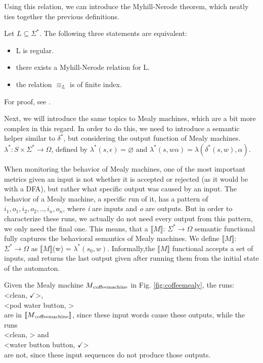 Using this relation, we can introduce the Myhill-Nerode theorem, which neatly ties together the previous definitions.

\begin{theorem}
	Let $L\subseteq\Sigma^*$. The following three statements are equivalent:
	\begin{itemize}
		\item L is regular.
		\item there exists a Myhill-Nerode relation for L.
		\item the relation $\equiv_L$ is of finite index.
	\end{itemize}
	For proof, see \cite{Kozen1977}\cite{10.2307/2033204}.
\end{theorem}

Next, we will introduce the same topics to Mealy machines, which are a bit more complex in this regard. In order to do this, we need to introduce a semantic helper similar to $\delta^*$, but considering the output function of Mealy machines. $\lambda^*: S\times\Sigma^* \to \Omega$, defined by $\lambda^*(s, \epsilon) = \varnothing$ and $\lambda^*(s, w\alpha) = \lambda(\delta^*(s, w), \alpha)$.



When monitoring the behavior of Mealy machines, one of the most important metrics given an input is not whether it is accepted or rejected (as it would be with a DFA), but rather what specific output was caused by an input. The behavior of a Mealy machine, a specific run of it, has a pattern of \textit{$i_1,o_1,i_2,o_2,..,i_n,o_n$}, where \textit{i} are inputs and \textit{o} are outputs. But in order to characterize these runs, we actually do not need every output from this pattern, we only need the final one. This means, that a $\llbracket M\rrbracket$: $\Sigma^*\to\Omega$ semantic functional fully captures the behavioral semantics of Mealy machines. We define $\llbracket M\rrbracket$: $\Sigma^*\to\Omega$ as  $\llbracket M\rrbracket$(w) = $\lambda^*(s_0, w)$. Informally,the  $\llbracket M\rrbracket$ functional accepts a set of inputs, and returns the last output given after running them from the initial state of the automaton. 

\begin{example}
	Given the Mealy machine $M\textsubscript{coffeemachine}$ in Fig. \ref{fig:coffeemealy}, the runs:\\
	\null\qquad<clean, $\checkmark$>, \\
	\null\qquad<pod water button, \Coffeecup> \\
	are in $\llbracket M\textsubscript{coffeemachine}\rrbracket$, since these input words cause these outputs, while the runs\\
	\null\qquad<clean, \Coffeecup> and \\
	\null\qquad<water button button, $\checkmark$> \\
	are not, since these input sequences do not produce those outputs.
\end{example}


